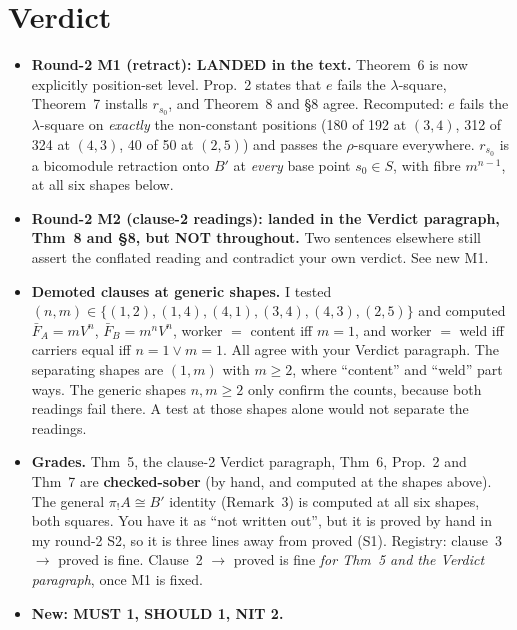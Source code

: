 \documentclass[10pt]{article}
\begin{document}
\section*{Verdict}
\begin{itemize}[leftmargin=*]
\item \textbf{Round-2 M1 (retract): LANDED in the text.} Theorem~6 is now explicitly position-set level. Prop.~2 states
  that $e$ fails the $\lambda$-square, Theorem~7 installs $r_{s_0}$, and Theorem~8 and \S8 agree. Recomputed:
  $e$ fails the $\lambda$-square on \emph{exactly} the non-constant positions (180 of 192 at $(3,4)$, 312 of 324 at $(4,3)$,
  40 of 50 at $(2,5)$) and passes the $\rho$-square everywhere. $r_{s_0}$ is a bicomodule retraction onto $B'$ at
  \emph{every} base point $s_0\in S$, with fibre $m^{n-1}$, at all six shapes below.
\item \textbf{Round-2 M2 (clause-2 readings): landed in the Verdict paragraph, Thm~8 and \S8, but NOT throughout.}
  Two sentences elsewhere still assert the conflated reading and contradict your own verdict. See new M1.
\item \textbf{Demoted clauses at generic shapes.} I tested $(n,m)\in\{(1,2),(1,4),(4,1),(3,4),(4,3),(2,5)\}$ and
  computed $\bar F_A=mV^n$, $\bar F_B=m^nV^n$, worker $=$ content iff $m=1$, and worker $=$ weld iff carriers equal iff $n=1\vee m=1$.
  All agree with your Verdict paragraph. The separating shapes are $(1,m)$ with $m\ge2$, where ``content'' and ``weld''
  part ways. The generic shapes $n,m\ge2$ only confirm the counts, because both readings fail there. A test at those
  shapes alone would not separate the readings.
\item \textbf{Grades.} Thm~5, the clause-2 Verdict paragraph, Thm~6, Prop.~2 and Thm~7 are \textbf{checked-sober} (by hand, and computed at the shapes above).
  The general $\pi_!A\cong B'$ identity (Remark~3) is computed at all six shapes, both squares. You have it as
  ``not written out'', but it is proved by hand in my round-2 S2, so it is three lines away from proved (S1).
  Registry: clause~3 $\to$ proved is fine. Clause~2 $\to$ proved is fine \emph{for Thm~5 and the Verdict paragraph}, once M1 is fixed.
\item \textbf{New: MUST 1, SHOULD 1, NIT 2.}
\end{itemize}
\end{document}
